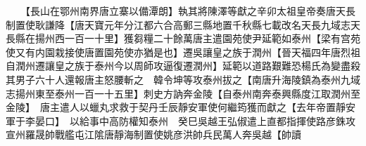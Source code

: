 　　【長山在鄂州南界唐立寨以備潭朗】執其將陳澤等獻之辛卯太祖皇帝奏唐天長制置使耿謙降【唐天寶元年分江都六合高郵三縣地置千秋縣七載改名天長九域志天長縣在揚州西一百一十里】獲芻糧二十餘萬唐主遣園苑使尹延範如泰州【梁有宫苑使又有内園栽接使唐置園苑使亦猶是也】遷吳讓皇之族于潤州【晉天福四年唐烈祖自潤州遷讓皇之族于泰州今以周師攻逼復遷潤州】延範以道路艱難恐楊氏為變盡殺其男子六十人還報唐主怒腰斬之　韓令坤等攻泰州拔之【南唐升海陵鎮為泰州九域志揚州東至泰州一百一十五里】刺史方訥奔金陵【自泰州南奔泰興縣度江取潤州至金陵】　唐主遣人以蠟丸求救于契丹壬辰靜安軍使何繼筠獲而獻之【去年帝置靜安軍于李晏口】　以給事中高防權知泰州　癸巳吳越王弘俶遣上直都指揮使路彦銖攻宣州羅晟帥戰艦屯江隂唐靜海制置使姚彦洪帥兵民萬人奔吳越【帥讀